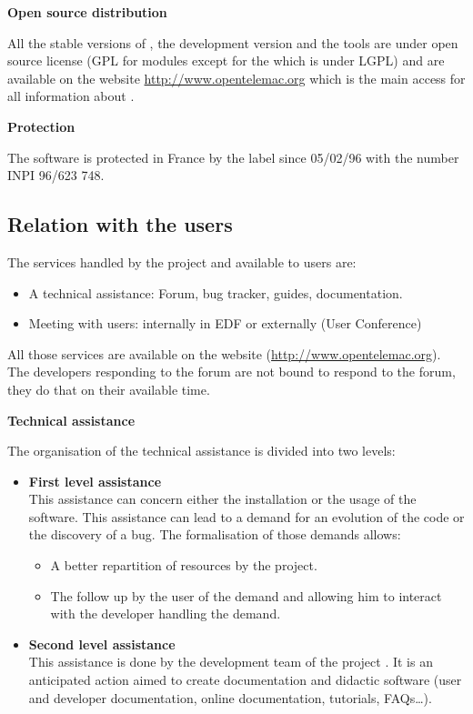\textbf{Open source distribution}

All the stable versions of \telemacsystem, the development version and the tools
are under open source license (GPL for \telemacsystem{} modules except for the
\bief{} which is under LGPL) and are available on the website
\url{http://www.opentelemac.org} which is the main access for all information
about \telemacsystem.

\textbf{Protection}

The software is protected in France by the label \tel{} since 05/02/96 with the
number INPI 96/623 748.

\subsection{Relation with the \telemacsystem{} users}

The services handled by the \telemacsystem{} project and available to users
are:
\begin{itemize}
\item A technical assistance: Forum, bug tracker, guides, documentation.
\item Meeting with users: internally in EDF or externally (User Conference)
\end{itemize}

All those services are available on the \telemacsystem{} website
(\url{http://www.opentelemac.org}).
The developers responding to the forum are not bound to respond to the forum,
they do that on their available time.

\textbf{Technical assistance}

The organisation of the technical assistance is divided into two levels:
\begin{itemize}
\item \textbf{First level assistance}\\ This assistance can concern either the
  installation or the usage of the software. This assistance can lead to a
  demand for an evolution of the code or the discovery of a bug. The
  formalisation of those demands allows:
  \begin{itemize}
  \item A better repartition of resources by the project.
  \item The follow up by the user of the demand and allowing him to interact
    with the developer handling the demand.
  \end{itemize}
\item \textbf{Second level assistance}\\ This assistance is done by the
  development team of the project \telemacsystem.  It is an anticipated action
  aimed to create documentation and didactic software (user and developer
  documentation, online documentation, tutorials, FAQs\ldots).
\end{itemize}

